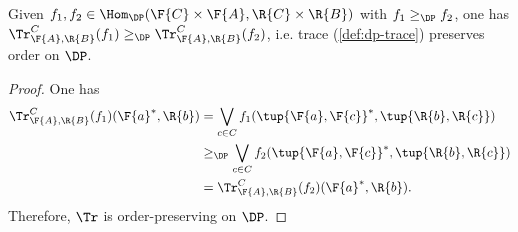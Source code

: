 \begin{lemma}
Given $f_1,f_2\in \Hom_\DP(\F{C}\times \F{A},\R{C}\times \R{B})$ with $f_1\geq_\DP f_2$, one has $\Tr_{\F{A},\R{B}}^C(f_1)\geq_\DP \Tr_{\F{A},\R{B}}^C(f_2)$, i.e. trace (\cref{def:dp-trace}) preserves order on $\DP$.
\end{lemma}

\begin{proof}
One has
\begin{equation}
    \begin{aligned}
    \Tr_{\F{A},\R{B}}^C(f_1)(\F{a}^*,\R{b})&=\bigvee_{c\in C}f_1(\tup{\F{a},\F{c}}^*,\tup{\R{b},\R{c}})\\
    &\geq_\DP \bigvee_{c\in C}f_2(\tup{\F{a},\F{c}}^*,\tup{\R{b},\R{c}})\\
    &=\Tr_{\F{A},\R{B}}^C(f_2)(\F{a}^*,\R{b}).
    \end{aligned}
\end{equation}
Therefore, $\Tr$ is order-preserving on $\DP$.
\end{proof}